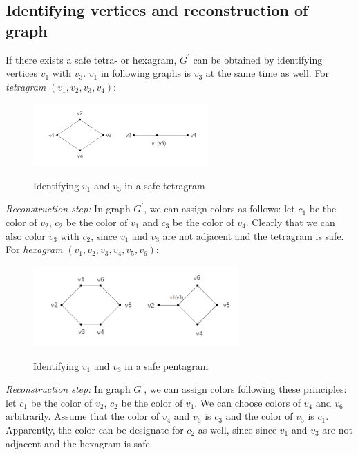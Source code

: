 \subsection{Identifying vertices and reconstruction of graph}

If there exists a safe tetra- or hexagram, $G^{'}$ can be obtained by identifying vertices $v_1$ with $v_3$. $v_1$ in following graphs is $v_3$ at the same time as well. For \textit{tetragram} $(v_1, v_2, v_3, v_4)$:
\begin{figure}[H] %
\centering %
\includegraphics[width=0.6\textwidth]{figure/identifyingv1v3.png} 
\label{figure} %
\caption{Identifying $v_1$ and $v_3$ in a safe tetragram}
\end{figure}

\textit{Reconstruction step: }In graph $G^{'}$, we can assign colors as follows: let $c_1$ be the color of $v_2$, $c_2$ be the color of $v_1$ and $c_3$ be the color of $v_4$. Clearly that we can also color $v_3$ with $c_2$, since $v_1$ and $v_3$ are not adjacent and the tetragram is safe.\\

For \textit{hexagram} $(v_1, v_2, v_3, v_4, v_5, v_6)$: 
\begin{figure}[H] %
\centering %
\includegraphics[width=0.7\textwidth]{figure/identifyingv1v32.png} 
\label{figure} %
\caption{Identifying $v_1$ and $v_3$ in a safe pentagram}
\end{figure}

\textit{Reconstruction step: }In graph $G^{'}$, we can assign colors following these principles: let $c_1$ be the color of $v_2$, $c_2$ be the color of $v_1$. We can choose colors of $v_4$ and $v_6$ arbitrarily. Assume that the color of $v_4$ and $v_6$ is $c_3$ and the color of $v_5$ is $c_1$. Apparently, the color can be designate for $c_2$ as well, since since $v_1$ and $v_3$ are not adjacent and the hexagram is safe.\\

